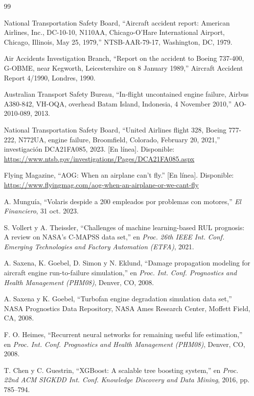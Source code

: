 \documentclass[conference]{IEEEtran}
\begin{document}
\begin{thebibliography}{99}
\footnotesize

 National Transportation Safety Board, ``Aircraft accident report: American Airlines, Inc., DC-10-10, N110AA, Chicago-O'Hare International Airport, Chicago, Illinois, May 25, 1979,'' NTSB-AAR-79-17, Washington, DC, 1979.

 Air Accidents Investigation Branch, ``Report on the accident to Boeing 737-400, G-OBME, near Kegworth, Leicestershire on 8 January 1989,'' Aircraft Accident Report 4/1990, Londres, 1990.

 Australian Transport Safety Bureau, ``In-flight uncontained engine failure, Airbus A380-842, VH-OQA, overhead Batam Island, Indonesia, 4 November 2010,'' AO-2010-089, 2013.

 National Transportation Safety Board, ``United Airlines flight 328, Boeing 777-222, N772UA, engine failure, Broomfield, Colorado, February 20, 2021,'' investigación DCA21FA085, 2023. [En línea]. Disponible: \url{https://www.ntsb.gov/investigations/Pages/DCA21FA085.aspx}

 Flying Magazine, ``AOG: When an airplane can't fly.'' [En línea]. Disponible: \url{https://www.flyingmag.com/aog-when-an-airplane-or-we-cant-fly}

 A. Munguía, ``Volaris despide a 200 empleados por problemas con motores,'' \emph{El Financiero}, 31 oct. 2023.

 S. Vollert y A. Theissler, ``Challenges of machine learning-based RUL prognosis: A review on NASA's C-MAPSS data set,'' en \emph{Proc. 26th IEEE Int. Conf. Emerging Technologies and Factory Automation (ETFA)}, 2021.

 A. Saxena, K. Goebel, D. Simon y N. Eklund, ``Damage propagation modeling for aircraft engine run-to-failure simulation,'' en \emph{Proc. Int. Conf. Prognostics and Health Management (PHM08)}, Denver, CO, 2008.

 A. Saxena y K. Goebel, ``Turbofan engine degradation simulation data set,'' NASA Prognostics Data Repository, NASA Ames Research Center, Moffett Field, CA, 2008.

 F. O. Heimes, ``Recurrent neural networks for remaining useful life estimation,'' en \emph{Proc. Int. Conf. Prognostics and Health Management (PHM08)}, Denver, CO, 2008.

 T. Chen y C. Guestrin, ``XGBoost: A scalable tree boosting system,'' en \emph{Proc. 22nd ACM SIGKDD Int. Conf. Knowledge Discovery and Data Mining}, 2016, pp. 785--794.


\end{thebibliography}
\end{document}

